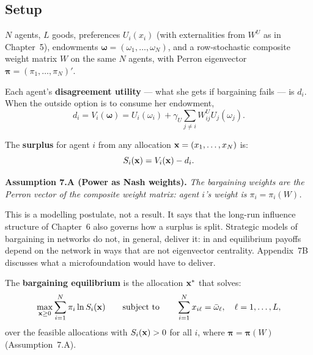 \documentclass[../structural_economics_book.tex]{subfiles}
\begin{document}
\subsection{Setup}

$N$ agents, $L$ goods, preferences $U_i(x_i)$ (with externalities from $W^U$ as in Chapter~5), endowments $\boldsymbol{\omega} = (\omega_1, \ldots, \omega_N)$, and a row-stochastic composite weight matrix $W$ on the same $N$ agents, with Perron eigenvector $\boldsymbol{\pi} = (\pi_1, \ldots, \pi_N)'$.

Each agent's \textbf{disagreement utility} --- what she gets if bargaining fails --- is $d_i$. When the outside option is to consume her endowment,
\begin{equation}\label{ch07:eq:disagreement}
d_i = V_i(\boldsymbol{\omega}) = U_i(\omega_i) + \gamma_U \sum_{j \neq i} W^U_{ij} U_j(\omega_j).
\end{equation}

The \textbf{surplus} for agent $i$ from any allocation $\mathbf{x} = (x_1, \ldots, x_N)$ is:
\begin{equation}
S_i(\mathbf{x}) = V_i(\mathbf{x}) - d_i.
\end{equation}

\medskip\noindent\textbf{Assumption 7.A (Power as Nash weights).} \textit{The bargaining weights are the Perron vector of the composite weight matrix: agent $i$'s weight is $\pi_i = \pi_i(W)$.}
\medskip

This is a modelling postulate, not a result. It says that the long-run influence structure of Chapter~6 also governs how a surplus is split. Strategic models of bargaining in networks do not, in general, deliver it: in \citet{manea2011bargaining} and \citet{abreu2012bargaining,abreu2012markov} equilibrium payoffs depend on the network in ways that are not eigenvector centrality. Appendix~7B discusses what a microfoundation would have to deliver.

\begin{definition}\label{ch07:def:bargaining_eq}
The \textbf{bargaining equilibrium} is the allocation $\mathbf{x}^*$ that solves:
\begin{equation}\label{ch07:eq:bargaining}
\max_{\mathbf{x} \geq 0} \sum_{i=1}^N \pi_i \ln S_i(\mathbf{x}) \qquad \text{subject to} \qquad \sum_{i=1}^N x_{i\ell} = \bar{\omega}_\ell, \quad \ell = 1, \ldots, L,
\end{equation}
over the feasible allocations with $S_i(\mathbf{x}) > 0$ for all $i$, where $\boldsymbol{\pi} = \boldsymbol{\pi}(W)$ (Assumption~7.A).
\end{definition}
\end{document}
